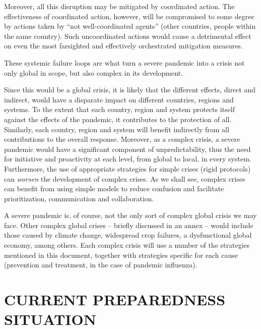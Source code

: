 \documentclass[12pt, a4]{scrartcl}
\begin{document}
Moreover, all this disruption may be mitigated by coordinated action. The effectiveness of coordinated action, however, will be compromised to some degree by actions taken by “not well-coordinated agents” (other countries, people within the same country). Such uncoordinated actions would cause a detrimental effect on even the most farsighted and effectively orchestrated mitigation measures.

These systemic failure loops are what turn a severe pandemic into a crisis not only global in scope, but also complex in its development.

Since this would be a global crisis, it is likely that the different effects, direct and indirect, would have a disparate impact on different countries, regions and systems. To the extent that each country, region and system protects itself against the effects of the pandemic, it contributes to the protection of all. Similarly, each country, region and system will benefit indirectly from all contributions to the overall response. Moreover, as a complex crisis, a severe pandemic would have a significant component of unpredictability, thus the need for initiative and proactivity at each level, from global to local, in every system. Furthermore, the use of appropriate strategies for simple crises (rigid protocols) can \emph{worsen} the development of complex crises. As we shall see, complex crises can benefit from using simple models to reduce confusion and facilitate prioritization, communication and collaboration.

A severe pandemic is, of course, not the only sort of complex global crisis we may face. Other complex global crises – briefly discussed in an annex – would include those caused by climate change, widespread crop failures, a dysfunctional global economy, among others. Each complex crisis will use a number of the strategies mentioned in this document, together with strategies specific for each cause (prevention and treatment, in the case of pandemic influenza).

\newpage
\section{CURRENT PREPAREDNESS SITUATION}
\end{document}
